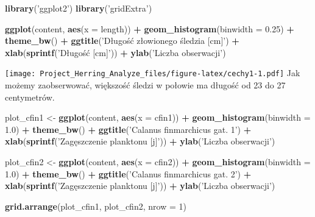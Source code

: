 \documentclass[]{article}
\newenvironment{Shaded}{\begin{snugshade}}{\end{snugshade}}
\newcommand{\DataTypeTok}[1]{\textcolor[rgb]{0.13,0.29,0.53}{#1}}
\newcommand{\DecValTok}[1]{\textcolor[rgb]{0.00,0.00,0.81}{#1}}
\newcommand{\FloatTok}[1]{\textcolor[rgb]{0.00,0.00,0.81}{#1}}
\newcommand{\KeywordTok}[1]{\textcolor[rgb]{0.13,0.29,0.53}{\textbf{#1}}}
\newcommand{\NormalTok}[1]{#1}
\newcommand{\OperatorTok}[1]{\textcolor[rgb]{0.81,0.36,0.00}{\textbf{#1}}}
\newcommand{\StringTok}[1]{\textcolor[rgb]{0.31,0.60,0.02}{#1}}
\begin{document}
\begin{Shaded}
\begin{Highlighting}[]
\KeywordTok{library}\NormalTok{(}\StringTok{'ggplot2'}\NormalTok{)}
\KeywordTok{library}\NormalTok{(}\StringTok{'gridExtra'}\NormalTok{)}

\KeywordTok{ggplot}\NormalTok{(content, }\KeywordTok{aes}\NormalTok{(}\DataTypeTok{x =}\NormalTok{ length)) }\OperatorTok{+}\StringTok{ }\KeywordTok{geom_histogram}\NormalTok{(}\DataTypeTok{binwidth =} \FloatTok{0.25}\NormalTok{) }\OperatorTok{+}\StringTok{ }
\StringTok{  }\KeywordTok{theme_bw}\NormalTok{() }\OperatorTok{+}\StringTok{ }\KeywordTok{ggtitle}\NormalTok{(}\StringTok{'Długość złowionego śledzia [cm]'}\NormalTok{) }\OperatorTok{+}\StringTok{ }
\StringTok{  }\KeywordTok{xlab}\NormalTok{(}\KeywordTok{sprintf}\NormalTok{(}\StringTok{'Długość [cm]'}\NormalTok{)) }\OperatorTok{+}\StringTok{ }\KeywordTok{ylab}\NormalTok{(}\StringTok{'Liczba obserwacji'}\NormalTok{)}
\end{Highlighting}
\end{Shaded}

\texttt{[image: Project\_Herring\_Analyze\_files/figure-latex/cechy1-1.pdf]}
Jak możemy zaobserwować, większość śledzi w połowie ma długość od 23 do
27 centymetrów.

\begin{Shaded}
\begin{Highlighting}[]
\NormalTok{plot_cfin1 <-}\StringTok{ }\KeywordTok{ggplot}\NormalTok{(content, }\KeywordTok{aes}\NormalTok{(}\DataTypeTok{x =}\NormalTok{ cfin1)) }\OperatorTok{+}\StringTok{ }\KeywordTok{geom_histogram}\NormalTok{(}\DataTypeTok{binwidth =} \FloatTok{1.0}\NormalTok{) }\OperatorTok{+}
\StringTok{  }\KeywordTok{theme_bw}\NormalTok{() }\OperatorTok{+}\StringTok{ }\KeywordTok{ggtitle}\NormalTok{(}\StringTok{'Calanus finmarchicus gat. 1'}\NormalTok{) }\OperatorTok{+}\StringTok{ }
\StringTok{  }\KeywordTok{xlab}\NormalTok{(}\KeywordTok{sprintf}\NormalTok{(}\StringTok{'Zagęszczenie planktonu [j]'}\NormalTok{)) }\OperatorTok{+}\StringTok{ }\KeywordTok{ylab}\NormalTok{(}\StringTok{'Liczba obserwacji'}\NormalTok{)}

\NormalTok{plot_cfin2 <-}\StringTok{ }\KeywordTok{ggplot}\NormalTok{(content, }\KeywordTok{aes}\NormalTok{(}\DataTypeTok{x =}\NormalTok{ cfin2)) }\OperatorTok{+}\StringTok{ }\KeywordTok{geom_histogram}\NormalTok{(}\DataTypeTok{binwidth =} \FloatTok{1.0}\NormalTok{) }\OperatorTok{+}
\StringTok{  }\KeywordTok{theme_bw}\NormalTok{() }\OperatorTok{+}\StringTok{ }\KeywordTok{ggtitle}\NormalTok{(}\StringTok{'Calanus finmarchicus gat. 2'}\NormalTok{) }\OperatorTok{+}\StringTok{ }
\StringTok{  }\KeywordTok{xlab}\NormalTok{(}\KeywordTok{sprintf}\NormalTok{(}\StringTok{'Zagęszczenie planktonu [j]'}\NormalTok{)) }\OperatorTok{+}\StringTok{ }\KeywordTok{ylab}\NormalTok{(}\StringTok{'Liczba obserwacji'}\NormalTok{)}

\KeywordTok{grid.arrange}\NormalTok{(plot_cfin1, plot_cfin2, }\DataTypeTok{nrow =} \DecValTok{1}\NormalTok{)}
\end{Highlighting}
\end{Shaded}
\end{document}
